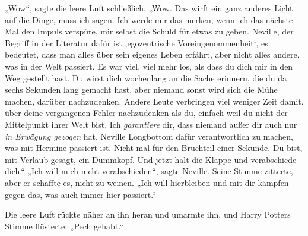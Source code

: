 „Wow“, sagte die leere Luft schließlich.
„Wow. Das wirft ein ganz anderes Licht auf die Dinge, muss ich sagen. Ich werde mir das merken, wenn ich das nächste Mal den Impuls verspüre, mir selbst die Schuld für etwas zu geben. Neville, der Begriff in der Literatur dafür ist ‚egozentrische Voreingenommenheit‘, es bedeutet, dass man alles über sein eigenes Leben erfährt, aber nicht alles andere, was in der Welt passiert. Es war viel, viel mehr los, als dass du dich mir in den Weg gestellt hast. Du wirst dich wochenlang an die Sache erinnern, die du da sechs Sekunden lang gemacht hast, aber niemand sonst wird sich die Mühe machen, darüber nachzudenken. Andere Leute verbringen viel weniger Zeit damit, über deine vergangenen Fehler nachzudenken als du, einfach weil du nicht der Mittelpunkt ihrer Welt bist. Ich \emph{garantiere} dir, dass niemand außer dir auch nur \emph{in Erwägung gezogen} hat, Neville Longbottom dafür verantwortlich zu machen, was mit Hermine passiert ist. Nicht mal für den Bruchteil einer Sekunde. Du bist, mit Verlaub gesagt, ein Dummkopf. Und jetzt halt die Klappe und verabschiede dich.“
„Ich will mich nicht verabschieden“, sagte Neville. Seine Stimme zitterte, aber er schaffte es, nicht zu weinen.
„Ich will hierbleiben und mit dir kämpfen — gegen das, was auch immer hier passiert.“

Die leere Luft rückte näher an ihn heran und umarmte ihn, und Harry Potters Stimme flüsterte:
„Pech gehabt.“

